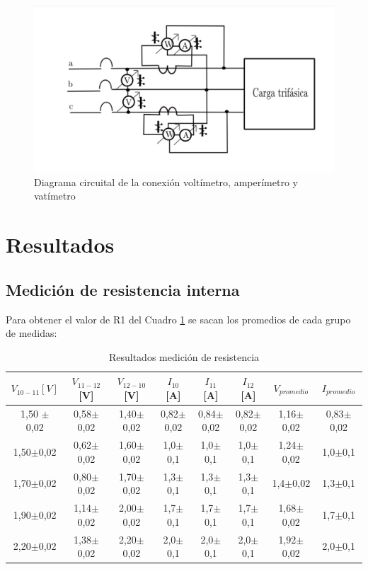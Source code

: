 \documentclass[11pt,letterpaper]{article}     %
\begin{document}
\begin{figure}[H]
	\centering
	\includegraphics[scale=0.2]{./recursos-Lab8/diagramaCircuitalmedicionPotenciaVoltajeCorriente.jpg}
	\caption{Diagrama circuital de la conexión voltímetro, amperímetro y vatímetro}
	\label{fig:diagramaDeConexion}
\end{figure}


\section{Resultados}
\subsection{Medición de resistencia interna}
Para obtener el valor de R1 del Cuadro \ref{cuadro medicion de resistencia} se sacan los promedios de cada grupo de medidas:
\begin{table}[H]
	\centering
	\caption{Resultados medición de resistencia}
	\label{cuadro medicion de resistencia}
	\begin{tabular}{|c|c|c|c|c|c|c|c|}
		\hline
		$V_{10-11} [V]$ &$ V_{11-12} $[V] &$ V_{12-10}$ [V] &$ I_{10}$ [A] & $I_{11}$ [A] &$ I_{12}$ [A] &$ V_{promedio}$ & $I_{promedio}$ \\ \hline
		1,50 $\pm$ 0,02 & 0,58$\pm$0,02 & 1,40$\pm$0,02 & 0,82$\pm$0,02 & 0,84$\pm$0,02 & 0,82$\pm$0,02 & 1,16$\pm$0,02 & 0,83$\pm$0,02 \\ \hline
		1,50$\pm$0,02 & 0,62$\pm$0,02 & 1,60$\pm$0,02 & 1,0$\pm$0,1 & 1,0$\pm$0,1 & 1,0$\pm$0,1 & 1,24$\pm$0,02 & 1,0$\pm$0,1 \\ \hline
		1,70$\pm$0,02 & 0,80$\pm$0,02 & 1,70$\pm$0,02 & 1,3$\pm$0,1 & 1,3$\pm$0,1 & 1,3$\pm$0,1 & 1,4$\pm$0,02 & 1,3$\pm$0,1 \\ \hline
		1,90$\pm$0,02 & 1,14$\pm$0,02 & 2,00$\pm$0,02 & 1,7$\pm$0,1 & 1,7$\pm$0,1 & 1,7$\pm$0,1 & 1,68$\pm$0,02 & 1,7$\pm$0,1 \\ \hline
		2,20$\pm$0,02 & 1,38$\pm$0,02 & 2,20$\pm$0,02 & 2,0$\pm$0,1 & 2,0$\pm$0,1 & 2,0$\pm$0,1 & 1,92$\pm$0,02 & 2,0$\pm$0,1 \\ \hline
	\end{tabular}
\end{table}
\end{document}
